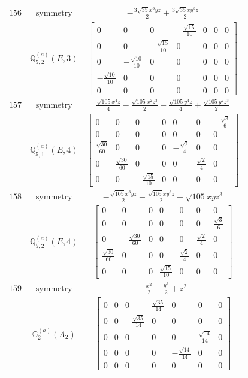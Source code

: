 \documentclass[fleqn,8pt,landscape]{jsarticle}
\begin{document}
\begin{longtable}{ccc}
$ 156 $ & $ \text{symmetry} $ & $ - \frac{3 \sqrt{35} x^{3} y z}{2} + \frac{3 \sqrt{35} x y^{3} z}{2} $ \\
$  $ & $ \mathbb{Q}_{5,2}^{(a)}(E,3) $ & $ \begin{bmatrix} 0 & 0 & 0 & - \frac{\sqrt{15}}{10} & 0 & 0 & 0 \\ 0 & 0 & - \frac{\sqrt{15}}{10} & 0 & 0 & 0 & 0 \\ 0 & - \frac{\sqrt{10}}{10} & 0 & 0 & 0 & 0 & 0 \\ - \frac{\sqrt{10}}{10} & 0 & 0 & 0 & 0 & 0 & 0 \\ 0 & 0 & 0 & 0 & 0 & 0 & 0 \end{bmatrix} $ \\ \hline
$ 157 $ & $ \text{symmetry} $ & $ \frac{\sqrt{105} x^{4} z}{4} - \frac{\sqrt{105} x^{2} z^{3}}{2} - \frac{\sqrt{105} y^{4} z}{4} + \frac{\sqrt{105} y^{2} z^{3}}{2} $ \\
$  $ & $ \mathbb{Q}_{5,1}^{(a)}(E,4) $ & $ \begin{bmatrix} 0 & 0 & 0 & 0 & 0 & 0 & - \frac{\sqrt{3}}{6} \\ 0 & 0 & 0 & 0 & 0 & 0 & 0 \\ \frac{\sqrt{30}}{60} & 0 & 0 & 0 & - \frac{\sqrt{2}}{4} & 0 & 0 \\ 0 & \frac{\sqrt{30}}{60} & 0 & 0 & 0 & \frac{\sqrt{2}}{4} & 0 \\ 0 & 0 & - \frac{\sqrt{15}}{10} & 0 & 0 & 0 & 0 \end{bmatrix} $ \\ \hline
$ 158 $ & $ \text{symmetry} $ & $ - \frac{\sqrt{105} x^{3} y z}{2} - \frac{\sqrt{105} x y^{3} z}{2} + \sqrt{105} x y z^{3} $ \\
$  $ & $ \mathbb{Q}_{5,2}^{(a)}(E,4) $ & $ \begin{bmatrix} 0 & 0 & 0 & 0 & 0 & 0 & 0 \\ 0 & 0 & 0 & 0 & 0 & 0 & \frac{\sqrt{3}}{6} \\ 0 & - \frac{\sqrt{30}}{60} & 0 & 0 & 0 & \frac{\sqrt{2}}{4} & 0 \\ \frac{\sqrt{30}}{60} & 0 & 0 & 0 & \frac{\sqrt{2}}{4} & 0 & 0 \\ 0 & 0 & 0 & \frac{\sqrt{15}}{10} & 0 & 0 & 0 \end{bmatrix} $ \\ \hline
$ 159 $ & $ \text{symmetry} $ & $ - \frac{x^{2}}{2} - \frac{y^{2}}{2} + z^{2} $ \\
$  $ & $ \mathbb{G}_{2}^{(a)}(A_{2}) $ & $ \begin{bmatrix} 0 & 0 & 0 & \frac{\sqrt{35}}{14} & 0 & 0 & 0 \\ 0 & 0 & - \frac{\sqrt{35}}{14} & 0 & 0 & 0 & 0 \\ 0 & 0 & 0 & 0 & 0 & \frac{\sqrt{14}}{14} & 0 \\ 0 & 0 & 0 & 0 & - \frac{\sqrt{14}}{14} & 0 & 0 \\ 0 & 0 & 0 & 0 & 0 & 0 & 0 \end{bmatrix} $ \\ \hline

\end{longtable}
\end{document}
